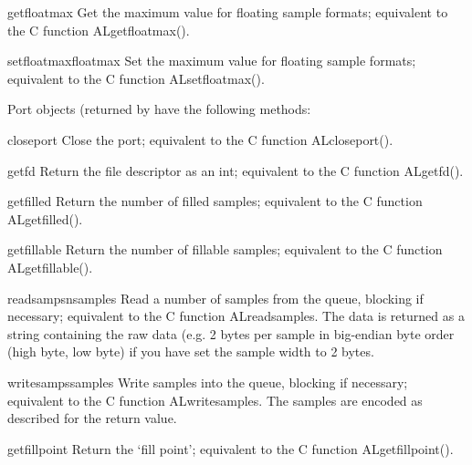 \begin{funcdesc}{getfloatmax}{}
Get the maximum value for floating sample formats;
equivalent to the C function ALgetfloatmax().
\end{funcdesc}

\begin{funcdesc}{setfloatmax}{floatmax}
Set the maximum value for floating sample formats;
equivalent to the C function ALsetfloatmax().
\end{funcdesc}

Port objects (returned by  have the following
methods:

\renewcommand{\indexsubitem}{(audio port object method)}
\begin{funcdesc}{closeport}{}
Close the port; equivalent to the C function ALcloseport().
\end{funcdesc}

\begin{funcdesc}{getfd}{}
Return the file descriptor as an int; equivalent to the C function
ALgetfd().
\end{funcdesc}

\begin{funcdesc}{getfilled}{}
Return the number of filled samples; equivalent to the C function
ALgetfilled().
\end{funcdesc}

\begin{funcdesc}{getfillable}{}
Return the number of fillable samples; equivalent to the C function
ALgetfillable().
\end{funcdesc}

\begin{funcdesc}{readsamps}{nsamples}
Read a number of samples from the queue, blocking if necessary;
equivalent to the C function ALreadsamples.  The data is returned as a
string containing the raw data (e.g. 2 bytes per sample in big-endian
byte order (high byte, low byte) if you have set the sample width to 2
bytes.
\end{funcdesc}

\begin{funcdesc}{writesamps}{samples}
Write samples into the queue, blocking if necessary; equivalent to the
C function ALwritesamples.  The samples are encoded as described for
the  return value.
\end{funcdesc}

\begin{funcdesc}{getfillpoint}{}
Return the `fill point'; equivalent to the C function ALgetfillpoint().
\end{funcdesc}

